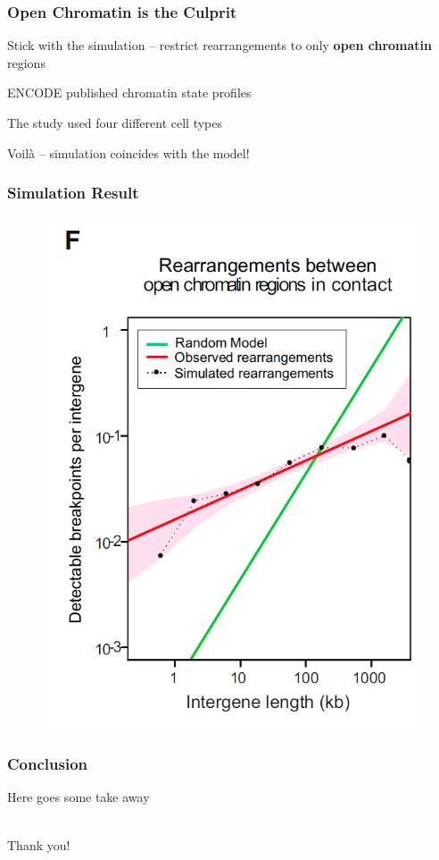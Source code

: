 \documentclass[svgnames,14pt]{beamer}
\begin{document}
\begin{frame}
\frametitle{Open Chromatin is the Culprit}
Stick with the simulation -- restrict rearrangements to only \textbf{open chromatin} regions
\vspace{12pt}

ENCODE published chromatin state profiles
\vspace{12pt}

The study used four different cell types
\vspace{12pt}

\pause
Voilà -- simulation coincides with the model!
\end{frame}

\begin{frame}
\frametitle{Simulation Result}
\begin{figure}
	\centering
	\includegraphics[scale = .38]{SimResult3.png}
\end{figure}
\end{frame}


\begin{frame}
\frametitle{Conclusion}
Here goes some take away
\end{frame}

\begin{frame}
\begin{center}
\hfill \huge \\
Thank you!
\end{center}
\end{frame}
\end{document}
